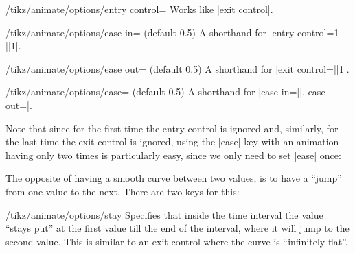 \begin{key}{/tikz/animate/options/entry control=}
    Works like |exit control|.
\end{key}

\begin{key}{/tikz/animate/options/ease in= (default 0.5)}
    A shorthand for |entry control={1-||}{1}|.
\end{key}

\begin{key}{/tikz/animate/options/ease out= (default 0.5)}
    A shorthand for |exit control={||}{1}|.
\end{key}

\begin{key}{/tikz/animate/options/ease= (default 0.5)}
    A shorthand for |ease in=||, ease out=|.

    Note that since for the first time the entry control is ignored and,
    similarly, for the last time the exit control is ignored, using the |ease|
    key with an animation having only two times is particularly easy, since we
    only need to set |ease| once:
\begin{codeexample}[
    preamble={\usetikzlibrary{animations}},
    animation list={0.333/\frac{1}{3},0.666/\frac{2}{3},1,1.333/1\frac{1}{3},1.666/1\frac{2}{3}},
]
\end{codeexample}
\end{key}

The opposite of having a smooth curve between two values, is to have a ``jump''
from one value to the next. There are two keys for this:

\begin{key}{/tikz/animate/options/stay}
    Specifies that inside the time interval the value ``stays put'' at the
    first value till the end of the interval, where it will jump to the second
    value. This is similar to an exit control where the curve is ``infinitely
    flat''.
\begin{codeexample}[
    preamble={\usetikzlibrary{animations}},
    animation list={0.5,1,1.5,2,2.5},
]
\end{codeexample}
\end{key}

